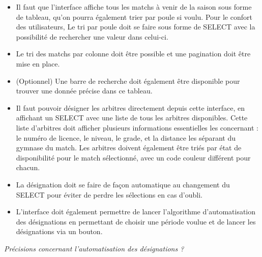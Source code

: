 \begin{itemize}
    \item Il faut que l’interface affiche tous les matchs à venir de la saison sous forme de tableau, qu’on pourra également trier par poule si voulu. Pour le confort des utilisateurs, Le tri par poule doit se faire sous forme de SELECT avec la possibilité de rechercher une valeur dans celui-ci.
    \item Le tri des matchs par colonne doit être possible et une pagination doit être mise en place.
    \item (Optionnel) Une barre de recherche doit également être disponible pour trouver une donnée précise dans ce tableau.
    \item Il faut pouvoir désigner les arbitres directement depuis cette interface, en affichant un SELECT avec une liste de tous les arbitres disponibles. Cette liste d’arbitres doit afficher plusieurs informations essentielles les concernant : le numéro de licence, le niveau, le grade, et la distance les séparant du gymnase du match. Les arbitres doivent également être triés par état de disponibilité pour le match sélectionné, avec un code couleur différent pour chacun.
    \item La désignation doit se faire de façon automatique au changement du SELECT pour éviter de perdre les sélections en cas d’oubli.
    \item L'interface doit également permettre de lancer l’algorithme d’automatisation des désignations en permettant de choisir une période voulue et de lancer les désignations via un bouton.
\end{itemize}

\newpage

\textit{Précisions concernant l'automatisation des désignations ?}\\

